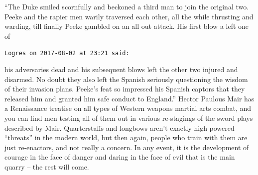 \begin{footnotesize}
\begin{sffamily}
``The Duke smiled scornfully and beckoned a third man to join the original two. Peeke and the rapier men warily traversed each other, all the while thrusting and warding, till finally Peeke gambled on an all out attack. His first blow a left one of

\hfill

\texttt{Logres on 2017-08-02 at 23:21 said:}

his adversaries dead and his subsequent blows left the other two injured and disarmed. No doubt they also left the Spanish seriously questioning the wisdom of their invasion plans. Peeke's feat so impressed his Spanish captors that they released him and granted him safe conduct to England.'' Hector Paulous Mair has a Renaissance treatise on all types of Western weapons martial arts combat, and you can find men testing all of them out in various re-stagings of the sword plays described by Mair. Quarterstaffs and longbows aren't exactly high powered ``threats'' in the modern world, but then again, people who train with them are just re-enactors, and not really a concern. In any event, it is the development of courage in the face of danger and daring in the face of evil that is the main quarry -- the rest will come.

\end{sffamily}
\end{footnotesize}

